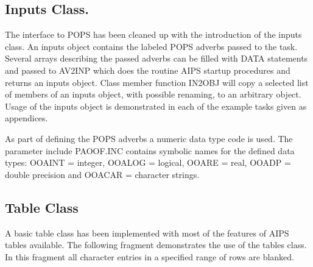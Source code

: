 \subsection{Inputs Class.}
   The interface to POPS has been cleaned up with the introduction of
the inputs class.  An inputs object contains the labeled POPS adverbs
passed to the task.  Several arrays describing the passed adverbs can
be filled with DATA statements and passed to AV2INP which does the
routine AIPS startup procedures and returns an inputs object.  Class
member function IN2OBJ will copy a selected list of members of an
inputs object, with possible renaming, to an arbitrary object.  Usage
of the inputs object is demonstrated in each of the example tasks
given as appendices.

   As part of defining the POPS adverbs a numeric data type code is
used.  The parameter include PAOOF.INC contains symbolic names for the
defined data types: OOAINT = integer, OOALOG = logical, OOARE = real,
OOADP = double precision and OOACAR = character strings.

\subsection{Table Class}
   A basic table class has been implemented with most of the features
of AIPS tables available.  The following fragment demonstrates the use
of the tables class.  In this fragment all character entries in a
specified range of rows are blanked.

